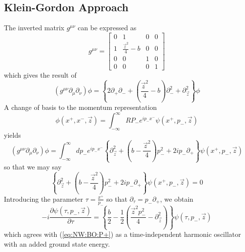 \documentclass[11pt, a4paper, titlepage]{article}
\newcommand{\be}{\begin{equation}}
\newcommand{\ee}{\end{equation}}
\newcommand{\pd}{\partial}
\newcommand{\lb}{\left(}
\newcommand{\rb}{\right)}
\newcommand{\eqn}[1]{(\ref{#1})}
\begin{document}
\subsection{Klein-Gordon Approach}
\label{sec:NW:KG}
The inverted matrix $g^{\mu\nu}$ can be expressed as
\be
 \label{eq:NW:KG:gmunu}
 g^{\mu\nu}=
        \left[\begin{array}{cccc}
        0 & 1 & 0 & 0 \\
        1 & \frac{\vec{z}^2}{4}-b & 0 & 0 \\
        0 & 0 & 1 & 0 \\
        0 & 0 & 0 & 1
        \end{array}\right]
\ee
which gives the result of
\be
 \label{eq:NW:KG:KG}
 \lb g^{\mu\nu}\pd_\mu\pd_\nu\rb \phi =
 \left\{ 2\pd_+\pd_- +\lb
 \frac{\vec{z}^2}{4}-b\rb\pd_-^2+\pd_{\vec{z}}^2\right\}\phi
\ee
A change of basis to the momentum representation
\be
 \label{eq:NW:KG:momentum}
 \phi\lb x^+,x^-,\vec{z}\rb
  =\int_{-\infty}^\infty RP_- e^{i p_- x^-}\psi\lb x^+,p_-,\vec{z}\rb
\ee
yields
\be
 \label{eq:NW:KG:KGmom1}
 \lb g^{\mu\nu}\pd_\mu\pd_\nu\rb \phi =\int_{-\infty}^\infty dp_- e^{i p_- x^-}\left\{
 \pd_{\vec{z}}^2+\lb b-\frac{\vec{z}^2}{4}\rb p_-^2
 +2ip_-\pd_+\right\}\psi\lb x^+,p_-,\vec{z}\rb
\ee
so that we may say
\be
 \label{eq:NW:KG:KGmom2}
 \left\{\pd_{\vec{z}}^2+\lb b-\frac{\vec{z}^2}{4}\rb p_-^2+2ip_-\pd_+\right\}
 \psi\lb x^+,p_-,\vec{z}\rb=0
\ee
Introducing the parameter $\tau=\frac{x^+}{p_-}$ so that
$\pd_\tau=p_-\pd_+$, we obtain
\be
 \label{eq:NW:KG:KGSHO}
 -i\frac{\pd \psi\lb \tau,p_-,\vec{z}\rb}{\pd \tau}=
 \left\{ \frac{b}{2} - \frac{1}{2}\lb
 \frac{\vec{z}^2p_-^2}{4} - \pd_{\vec{z}}^2 \rb\right\}
 \psi\lb \tau,p_-,\vec{z}\rb
\ee
which agrees with \eqn{eq:NW:BO:P+} as a time-independent harmonic
oscillator with an added ground state energy.
\appendix
\end{document}
